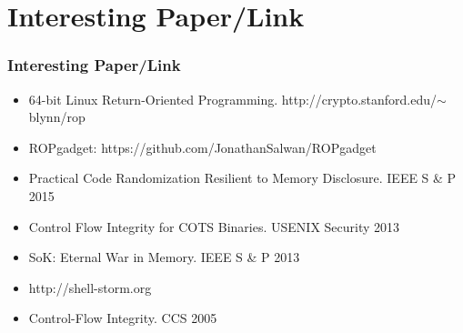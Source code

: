 \documentclass[aspectratio=169]{beamer}
\begin{document}

\section{Interesting Paper/Link}
\begin{frame}
\frametitle{Interesting Paper/Link}
\begin{itemize}
\item 64-bit Linux Return-Oriented Programming. http://crypto.stanford.edu/$\sim$blynn/rop
\item ROPgadget: https://github.com/JonathanSalwan/ROPgadget
\item Practical Code Randomization Resilient to Memory Disclosure. IEEE S \& P 2015
\item Control Flow Integrity for COTS Binaries. USENIX Security 2013
\item SoK: Eternal War in Memory. IEEE S \& P 2013
\item http://shell-storm.org
\item Control-Flow Integrity. CCS 2005
\end{itemize}
\end{frame}

\end{document}
